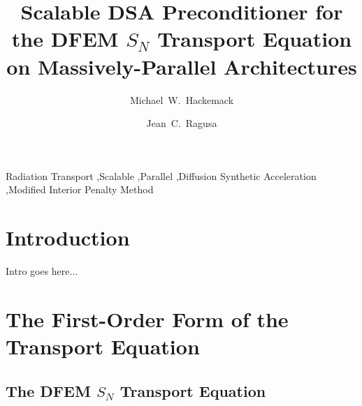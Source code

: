 \documentclass[preprint,review,12pt]{elsarticle}
\begin{document}
\begin{frontmatter}
\title{Scalable DSA Preconditioner for the DFEM $S_N$ Transport Equation on Massively-Parallel Architectures}
\author[kapl]{Michael~W.~Hackemack}
\author[tamu]{Jean~C.~Ragusa}
\address[kapl]{Knolls Atomic Power Laboratory, P.O. Box 1072, Schenectady, NY 12301}
\address[tamu]{Department of Nuclear Engineering, Texas A\&M University, College Station, TX 77843, USA}
\begin{abstract}

\end{abstract}
\begin{keyword}
Radiation Transport \sep Scalable \sep Parallel \sep Diffusion Synthetic Acceleration \sep Modified Interior Penalty Method
\end{keyword}
\end{frontmatter}

\linenumbers

\section{Introduction} \label{sec::intro}

Intro goes here...

\section{The First-Order Form of the Transport Equation} \label{sec::trans}

\subsection{The DFEM $S_N$ Transport Equation} \label{sec::trans_DFEMSn}
\end{document}
